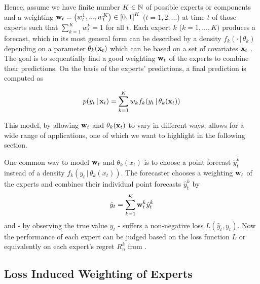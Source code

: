 Hence, assume we have finite number $K \in \mathbb{N}$ of possible experts or components and a weighting ${\bf w}_t = \left(w_t^1, ..., w_t^K\right) \in \left[0,1\right]^{K}$ ($t=1,2,...$) at time $t$ of those experts such that $\sum_{k=1}^{K} w_t^k = 1$ for all $t$. Each expert $k$ ($k= 1, ... , K)$ produces a forecast, which in its most general form can be described by a density $f_k(\cdot \,|\, \theta_k)$ depending on a parameter $\theta_k({\bf x}_t)$ which can be based on a set of covariates ${\bf x}_t$ \citep{gormley2018mixtures}. The goal is to sequentially find a good weighting ${\bf w}_t$ of the experts to combine their predictions. On the basis of the experts' predictions, a final prediction is computed as

\begin{equation}
    p(y_t \,|\, {\bf x}_t) = \sum_{k=1}^{K} w_k f_k(y_t \,|\, \theta_k({\bf x}_t))
\end{equation}

This model, by allowing ${\bf w}_t$ and $\theta_k({\bf x}_t)$ to vary in different ways, allows for a wide range of applications, one of which we want to highlight in the following section.

One common way to model ${\bf w}_t$ and $\theta_k(x_t)$ is to choose a point forecast $\hat y_t^{k}$ instead of a density $f_k ( y_t \,|\, \theta_k(x_t))$. The forecaster chooses a weighting ${\bf w}_t$ of the experts and combines their individual point forecasts $\hat y_t^{k}$ by
\begin{equation}
    \hat y_t = \sum_{k=1}^{K} {\bf w}_t^{k} \hat y_t^{k}
\end{equation}
and - by observing the true value $y_t$ - suffers a non-negative loss $L(\hat y_t, y_t)$. Now the performance of each expert can be judged based on the loss function $L$ or equivalently on each expert's regret $R_n^k$ from .


\subsection{Loss Induced Weighting of Experts}
\label{CH:ExpertModels:Loss}

